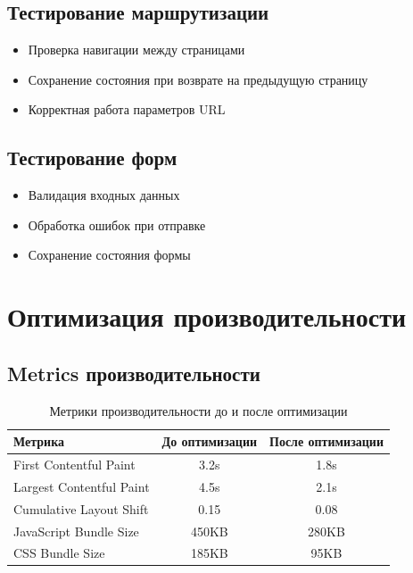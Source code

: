 \documentclass[12pt,a4paper]{report}
\begin{document}
\subsection{Тестирование маршрутизации}
\begin{itemize}
    \item Проверка навигации между страницами
    \item Сохранение состояния при возврате на предыдущую страницу
    \item Корректная работа параметров URL
\end{itemize}

\subsection{Тестирование форм}
\begin{itemize}
    \item Валидация входных данных
    \item Обработка ошибок при отправке
    \item Сохранение состояния формы
\end{itemize}

\section{Оптимизация производительности}

\subsection{Metrics производительности}

\begin{table}[H]
\centering
\begin{tabular}{|l|c|c|}
\hline
\textbf{Метрика} & \textbf{До оптимизации} & \textbf{После оптимизации} \\
\hline
First Contentful Paint & 3.2s & 1.8s \\
Largest Contentful Paint & 4.5s & 2.1s \\
Cumulative Layout Shift & 0.15 & 0.08 \\
JavaScript Bundle Size & 450KB & 280KB \\
CSS Bundle Size & 185KB & 95KB \\
\hline
\end{tabular}
\caption{Метрики производительности до и после оптимизации}
\end{table}
\end{document}
